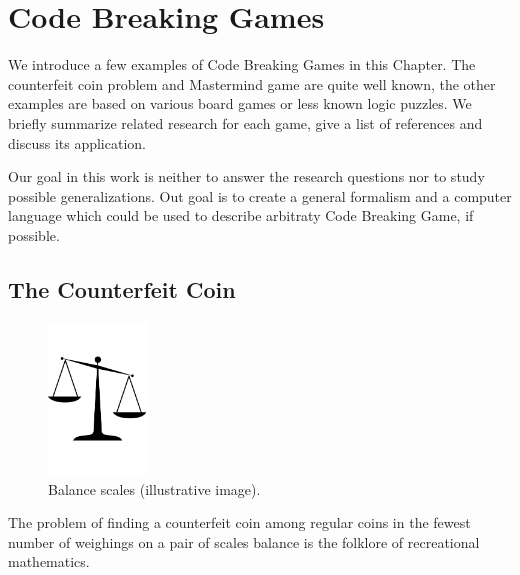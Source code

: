 \chapter{Code Breaking Games}
\label{ch:games}
We introduce a few examples of Code Breaking Games in this Chapter.
The counterfeit coin problem and Mastermind game are quite well known,
  the other examples are based on various board games or less known
  logic puzzles.
We briefly summarize related research for each game, give a list of
  references and discuss its application.

Our goal in this work is neither to answer the research questions nor
  to study possible generalizations.
Out goal is to create a general formalism and a computer language which could
  be used to describe arbitraty Code Breaking Game, if possible.

\section{The Counterfeit Coin}

\begin{figure}
  \begin{center}
  \vspace{-5mm}
  \includegraphics[width=0.23\textwidth]{pictures/scales.pdf}
  \vspace{-5mm}
  \end{center}
  \caption{Balance scales (illustrative image).}
  \vspace{-10mm}
\end{figure}

The problem of finding a counterfeit coin among regular coins in the fewest
  number of weighings on a pair of scales balance is the folklore of
  recreational mathematics.

